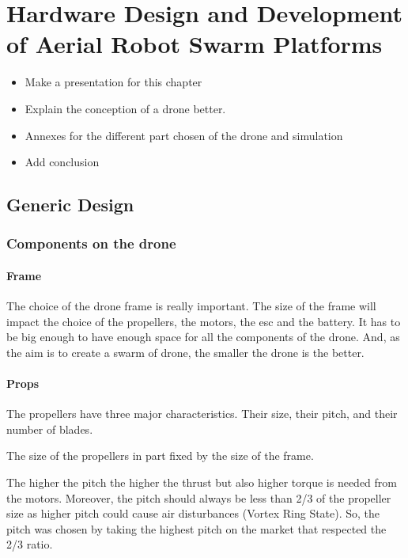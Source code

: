\chapter{Hardware Design and Development of Aerial Robot Swarm Platforms}

{\color{red}
\begin{itemize}
    \item Make a presentation for this chapter
    \item Explain the conception of a drone better.
    \item Annexes for the different part chosen of the drone and simulation
    \item Add conclusion
\end{itemize}
}

\section{Generic Design}

\subsection{Components on the drone}

\subsubsection{Frame}
The choice of the drone frame is really important.
The size of the frame will impact the choice of the propellers, the motors, the \acrshort{esc} and the battery.
It has to be big enough to have enough space for all the components of the drone.
And, as the aim is to create a swarm of drone, the smaller the drone is the better.

\subsubsection{Props}
The propellers have three major characteristics. Their size, their pitch, and their number of blades.

The size of the propellers in part fixed by the size of the frame.

The higher the pitch the higher the thrust but also higher torque is needed from the motors.
Moreover, the pitch should always be less than 2/3 of the propeller size as higher pitch could cause air disturbances (Vortex Ring State).
So, the pitch was chosen by taking the highest pitch on the market that respected the 2/3 ratio.

